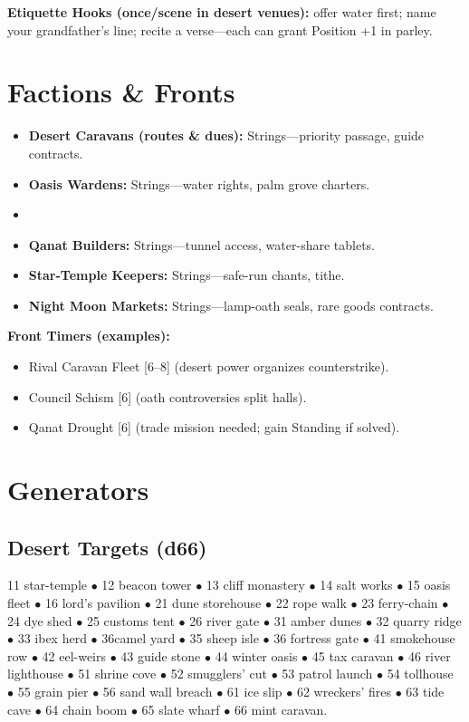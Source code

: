 \documentclass[11pt]{article}
\begin{document}
\textbf{Etiquette Hooks (once/scene in desert venues):} offer water first; name your grandfather's line; recite a verse---each can grant Position +1 in parley.

\section{Factions \& Fronts}
\begin{itemize}
\item \textbf{Desert Caravans (routes \& dues):} Strings---priority passage, guide contracts.
\item \textbf{Oasis Wardens:} Strings---water rights, palm grove charters.
\item \item \textbf{Qanat Builders:} Strings---tunnel access, water-share tablets.
\item \textbf{Star-Temple Keepers:} Strings---safe-run chants, tithe.
\item \textbf{Night Moon Markets:} Strings---lamp-oath seals, rare goods contracts.
\end{itemize}

\textbf{Front Timers (examples):}
\begin{itemize}
\item Rival Caravan Fleet [6--8] (desert power organizes counterstrike).
\item Council Schism [6] (oath controversies split halls).
\item Qanat Drought [6] (trade mission needed; gain Standing if solved).
\end{itemize}

\section{Generators}

\subsection{Desert Targets (d66)}

11 star-temple $\bullet$ 12 beacon tower $\bullet$ 13 cliff monastery $\bullet$ 14 salt works $\bullet$ 15 oasis fleet $\bullet$ 16 lord's pavilion $\bullet$ 21 dune storehouse $\bullet$ 22 rope walk $\bullet$ 23 ferry-chain $\bullet$ 24 dye shed $\bullet$ 25 customs tent $\bullet$ 26 river gate $\bullet$ 31 amber dunes $\bullet$ 32 quarry ridge $\bullet$ 33 ibex herd $\bullet$ 36camel yard $\bullet$ 35 sheep isle $\bullet$ 36 fortress gate $\bullet$ 41 smokehouse row $\bullet$ 42 eel-weirs $\bullet$ 43 guide stone $\bullet$ 44 winter oasis $\bullet$ 45 tax caravan $\bullet$ 46 river lighthouse $\bullet$ 51 shrine cove $\bullet$ 52 smugglers' cut $\bullet$ 53 patrol launch $\bullet$ 54 tollhouse $\bullet$ 55 grain pier $\bullet$ 56 sand wall breach $\bullet$ 61 ice slip $\bullet$ 62 wreckers' fires $\bullet$ 63 tide cave $\bullet$ 64 chain boom $\bullet$ 65 slate wharf $\bullet$ 66 mint caravan.
\end{document}
